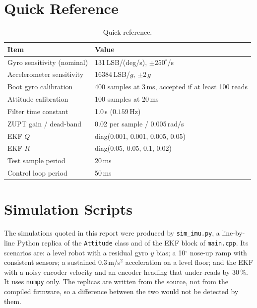\documentclass[11pt,a4paper]{report}
\newcommand{\code}[1]{\texttt{#1}}
\begin{document}
\appendix
\chapter{Quick Reference}
\begin{table}[H]
\centering
\caption{Quick reference.}
\small
\begin{tabular}{@{}ll@{}}
\toprule
Item & Value\\
\midrule
Gyro sensitivity (nominal) & 131\,LSB/(deg/s), $\pm250^\circ$/s\\
Accelerometer sensitivity & 16384\,LSB/$g$, $\pm2\,g$\\
Boot gyro calibration & 400 samples at 3\,ms, accepted if at least 100 reads\\
Attitude calibration & 100 samples at 20\,ms\\
Filter time constant & 1.0\,s ($0.159$\,Hz)\\
ZUPT gain / dead-band & 0.02 per sample / 0.005\,rad/s\\
EKF $Q$ & diag(0.001, 0.001, 0.005, 0.05)\\
EKF $R$ & diag(0.05, 0.05, 0.1, 0.02)\\
Test sample period & 20\,ms\\
Control loop period & 50\,ms\\
\bottomrule
\end{tabular}
\end{table}

\chapter{Simulation Scripts}\label{app:sim}
The simulations quoted in this report were produced by \code{sim\_imu.py}, a line-by-line Python replica of the \code{Attitude} class and of the EKF block of \code{main.cpp}. Its scenarios are: a level robot with a residual gyro $y$ bias; a 10$^\circ$ nose-up ramp with consistent sensors; a sustained 0.3\,m/s$^2$ acceleration on a level floor; and the EKF with a noisy encoder velocity and an encoder heading that under-reads by 30\,\%. It uses \code{numpy} only. The replicas are written from the source, not from the compiled firmware, so a difference between the two would not be detected by them.
\end{document}
